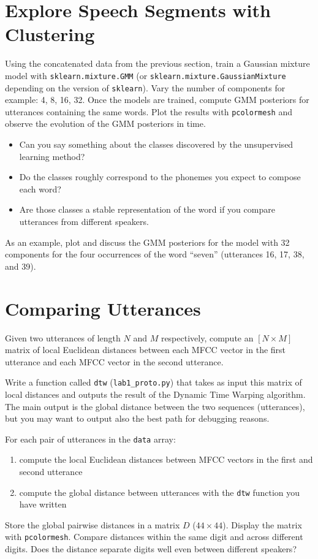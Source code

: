 \documentclass{nada-ten}
\begin{document}
\section{Explore Speech Segments with Clustering}

Using the concatenated data from the previous section, train a Gaussian mixture model with \texttt{sklearn.mixture.GMM} (or \texttt{sklearn.mixture.GaussianMixture} depending on the version of \texttt{sklearn}).
Vary the number of components for example: 4, 8, 16, 32.
Once the models are trained, compute GMM posteriors for utterances containing the same words.
Plot the results with \texttt{pcolormesh} and observe the evolution of the GMM posteriors in time.
\begin{itemize}
\item Can you say something about the classes discovered by the unsupervised learning method?
\item Do the classes roughly correspond to the phonemes you expect to compose each word?
\item Are those classes a stable representation of the word if you compare utterances from different speakers.
\end{itemize}
As an example, plot and discuss the GMM posteriors for the model with 32 components for the four occurrences of the word ``seven'' (utterances 16, 17, 38, and 39).

\section{Comparing Utterances}
Given two utterances of length $N$ and $M$ respectively, compute an $[N\times M]$ matrix of local Euclidean distances between each MFCC vector in the first utterance and each MFCC vector in the second utterance.

Write a function called \texttt{dtw} (\texttt{lab1\_proto.py}) that takes as input this matrix of local distances and outputs the result of the Dynamic Time Warping algorithm. The main output is the global distance between the two sequences (utterances), but you may want to output also the best path for debugging reasons.

For each pair of utterances in the  \texttt{data} array:
\begin{enumerate}
\item compute the local Euclidean distances between MFCC vectors in the first and second utterance
\item compute the global distance between utterances with the \texttt{dtw} function you have written
\end{enumerate}
Store the global pairwise distances in a matrix $D$ ($44\times 44$). Display the matrix with \texttt{pcolormesh}. Compare distances within the same digit and across different digits. Does the distance separate digits well even between different speakers?
\end{document}
